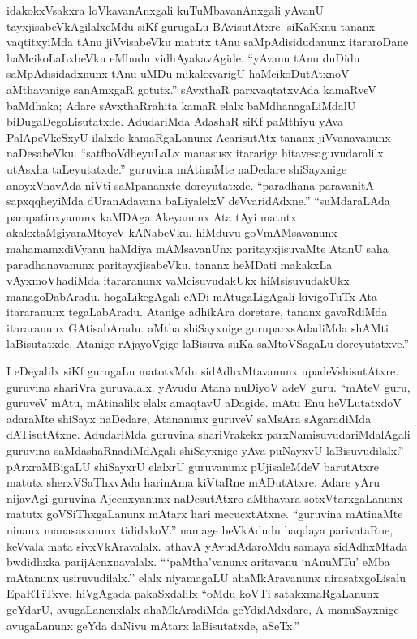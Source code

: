 idakokxVsakxra loVkavanAnxgali kuTuMbavanAnxgali yAvanU tayxjisabeVkAgilalx\break eMdu siKf gurugaLu BAvisutAtxre. siKaKxnu tananx vaqtitxyiMda tAnu jiVvisabeVku matutx tAnu saMpAdisidudanunx itararoDane haMcikoLaLxbeVku eMbudu vidhAyaka\-vAgide. ``yAvanu tAnu duDidu saMpAdisidadxnunx tAnu uMDu mikakxvarigU haMcikoDutAtxnoV aMthavanige sanAmxgaR gotutx.'' sAvxthaR parxvaqtatxvAda kamaRveV baMdhaka; Adare sAvxthaRrahita kamaR elalx baMdhanagaLiMdalU biDugaDegoLisutatxde. AdudariMda AdashaR siKf paMthiyu yAva PalApeVkeSxyU ilalxde kamaRgaLanunx AcarisutAtx tananx jiVvanavanunx naDesabeVku. ``satfboVdheyuLaLx manasusx itararige hitavesaguvudaralilx utAsxha taLeyutatxde.'' guruvina mAtinaMte naDedare shiSayxnige anoyxVnavAda niVti saMpananxte doreyutatxde. ``paradhana paravanitA sapxqqheyiMda dUranAdavana baLiyalelxV deVvaridAdxne.'' ``suMdaraLAda parapatinxyanunx kaMDAga Akeyanunx Ata tAyi matutx akakxtaMgiyaraMteyeV kANabeVku. hiMduvu goVmAMsavanunx mahamamxdiVyanu haMdiya mAMsavanUnx paritayxjisuvaMte AtanU saha paradhanavanunx paritayxjisabeVku. tananx heMDati makakxLa vAyxmoVhadiMda itararanunx vaMcisuvudakUkx hiMsisuvudakUkx managoDabAradu. hogaLikegAgali cADi mAtugaLigAgali kivigoTuTx Ata itararanunx tegaLabAradu. Atanige adhikAra doretare, tananx gavaRdiMda itararanunx GAtisabAradu. aMtha shiSayxnige guruparxsAdadiMda shAMti laBisutatxde. Atanige rAjayoVgige laBisuva suKa saMtoVSagaLu doreyutatxve.''

I eDeyalilx siKf gurugaLu matotxMdu sidAdhxMtavanunx upadeVshisutAtxre. guruvina shariVra guruvalalx. yAvudu Atana nuDiyoV adeV guru. ``mAteV guru, guruveV mAtu, mAtinalilx elalx amaqtavU aDagide. mAtu Enu heVLutatxdoV adaraMte shiSayx naDedare, Atananunx guruveV saMsAra sAgaradiMda dATisutAtxne. AdudariMda guruvina shariVrakekx parxNamisuvudariMdalAgali guruvina saMdashaRnadiMdAgali shiSayxnige yAva puNayxvU laBisuvudilalx.'' pArxraMBigaLU shiSayxrU elalxrU guruvanunx pUjisaleMdeV barutAtxre matutx sherxVSaThxvAda harinAma kiVtaRne mADutAtxre. Adare yAru nijavAgi guruvina Ajecnxyanunx naDesutAtxro aMthavara sotxVtarxgaLanunx matutx goVSiThxgaLanunx mAtarx hari mecucxtAtxne. ``guruvina mAtinaMte ninanx manasasxnunx tididxkoV.'' namage beVkAdudu haqdaya parivataRne, keVvala mata sivxVkAravalalx. athavA yAvudAdaroMdu samaya sidAdhxMtada bwdidhxka parijAcnxnavalalx. ```paMtha'vanunx aritavanu `nAnuMTu' eMba mAtanunx usiruvudilalx.'' elalx niyamagaLU ahaMkAravanunx nirasatxgoLisalu EpaRTiTxve. hiVgAgada pakaSxdalilx ``oMdu koVTi satakxmaRgaLanunx geYdarU, avugaLanenxlalx ahaMkAradiMda geYdidAdxdare, A manuSayxnige avugaLanunx geYda daNivu mAtarx laBisutatxde, aSeTx.''

